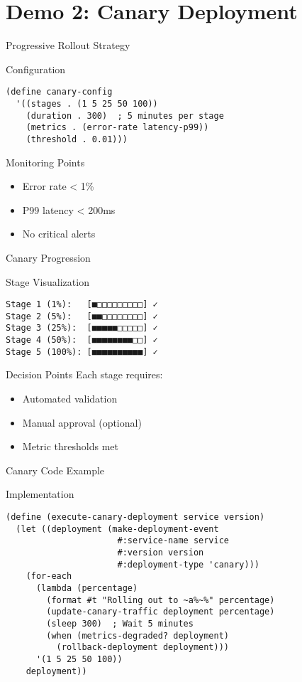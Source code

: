 \documentclass[presentation]{beamer}
\begin{document}
\section{Demo 2: Canary Deployment}
\label{sec:org57ffd8e}
\begin{frame}[label={sec:org0573385},fragile]{Progressive Rollout Strategy}
 \begin{block}{Configuration}
\begin{verbatim}
(define canary-config
  '((stages . (1 5 25 50 100))
    (duration . 300)  ; 5 minutes per stage
    (metrics . (error-rate latency-p99))
    (threshold . 0.01)))
\end{verbatim}
\end{block}
\begin{block}{Monitoring Points}
\begin{itemize}
\item Error rate < 1\%
\item P99 latency < 200ms
\item No critical alerts
\end{itemize}
\end{block}
\end{frame}
\begin{frame}[label={sec:org02d6fe5},fragile]{Canary Progression}
 \begin{block}{Stage Visualization}
\begin{verbatim}
Stage 1 (1%):   [■□□□□□□□□□] ✓
Stage 2 (5%):   [■■□□□□□□□□] ✓
Stage 3 (25%):  [■■■■■□□□□□] ✓
Stage 4 (50%):  [■■■■■■■■□□] ✓
Stage 5 (100%): [■■■■■■■■■■] ✓
\end{verbatim}
\end{block}
\begin{block}{Decision Points}
Each stage requires:
\begin{itemize}
\item Automated validation
\item Manual approval (optional)
\item Metric thresholds met
\end{itemize}
\end{block}
\end{frame}
\begin{frame}[label={sec:org4723ee8},fragile]{Canary Code Example}
 \begin{block}{Implementation}
\begin{verbatim}
(define (execute-canary-deployment service version)
  (let ((deployment (make-deployment-event
                      #:service-name service
                      #:version version
                      #:deployment-type 'canary)))
    (for-each
      (lambda (percentage)
        (format #t "Rolling out to ~a%~%" percentage)
        (update-canary-traffic deployment percentage)
        (sleep 300)  ; Wait 5 minutes
        (when (metrics-degraded? deployment)
          (rollback-deployment deployment)))
      '(1 5 25 50 100))
    deployment))
\end{verbatim}
\end{block}
\end{frame}
\end{document}

